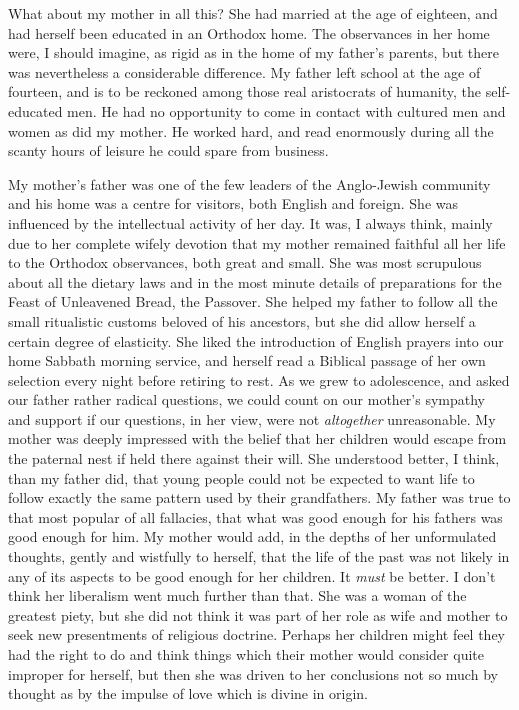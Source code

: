 What about my mother in all this? She had married
at the age of eighteen, and had herself been educated in
an Orthodox home. The observances in her home were,
I should imagine, as rigid as in the home of my father’s
parents, but there was nevertheless a considerable difference.
My father left school at the age of fourteen, and
is to be reckoned among those real aristocrats of humanity,
the self-educated men. He had no opportunity to
come in contact with cultured men and women as did my
mother. He worked hard, and read enormously during
all the scanty hours of leisure he could spare from
business.

My mother’s father was one of the few leaders of the
Anglo-Jewish community and his home was a centre for
visitors, both English and foreign. She was influenced
by the intellectual activity of her day. It was, I always
think, mainly due to her complete wifely devotion that
my mother remained faithful all her life to the Orthodox
observances, both great and small. She was most
scrupulous about all the dietary laws and in the most
minute details of preparations for the Feast of Unleavened
Bread, the Passover. She helped my father to follow all
the small ritualistic customs beloved of his ancestors,
but she did allow herself a certain degree of elasticity.
She liked the introduction of English prayers into our
home Sabbath morning service, and herself read a
Biblical passage of her own selection every night before
retiring to rest. As we grew to adolescence, and asked
our father rather radical questions, we could count on
our mother’s sympathy and support if our questions, in 
her view, were not \textsl{altogether} unreasonable. My mother
was deeply impressed with the belief that her children
would escape from the paternal nest if held there against
their will. She understood better, I think, than my
father did, that young people could not be expected to
want life to follow exactly the same pattern used by
their grandfathers. My father was true to that most
popular of all fallacies, that what was good enough for
his fathers was good enough for him. My mother would
add, in the depths of her unformulated thoughts, gently
and wistfully to herself, that the life of the past was not
likely in any of its aspects to be good enough for her
children. It \textsl{must} be better. I don’t think her liberalism
went much further than that. She was a woman of the
greatest piety, but she did not think it was part of her
role as wife and mother to seek new presentments of
religious doctrine. Perhaps her children might feel they
had the right to do and think things which their mother
would consider quite improper for herself, but then she
was driven to her conclusions not so much by thought as
by the impulse of love which is divine in origin.

